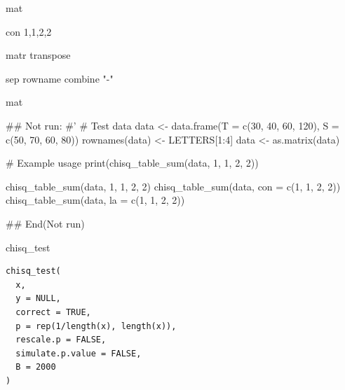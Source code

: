 \documentclass[a4paper]{book}
\begin{document}
%
\begin{Arguments}
\begin{ldescription}
\item[\code{data}] mat

\item[\code{...}] con 1,1,2,2

\item[\code{trans}] matr transpose

\item[\code{sep}] sep rowname combine  "-"
\end{ldescription}
\end{Arguments}
%
\begin{Value}
mat
\end{Value}
%
\begin{Examples}
\begin{ExampleCode}

\#\# Not run: 
#'
# Test data
data <- data.frame(T = c(30, 40, 60, 120),
                   S = c(50, 70, 60, 80))
rownames(data) <- LETTERS[1:4]
data <- as.matrix(data)

# Example usage
print(chisq_table_sum(data, 1, 1, 2, 2))

chisq_table_sum(data, 1, 1, 2, 2)
chisq_table_sum(data, con = c(1, 1, 2, 2))
chisq_table_sum(data, la = c(1, 1, 2, 2))


## End(Not run)



\end{ExampleCode}
\end{Examples}
%
\begin{Description}
chisq\_test
\end{Description}
%
\begin{Usage}
\begin{verbatim}
chisq_test(
  x,
  y = NULL,
  correct = TRUE,
  p = rep(1/length(x), length(x)),
  rescale.p = FALSE,
  simulate.p.value = FALSE,
  B = 2000
)
\end{verbatim}
\end{Usage}
%
\end{document}
